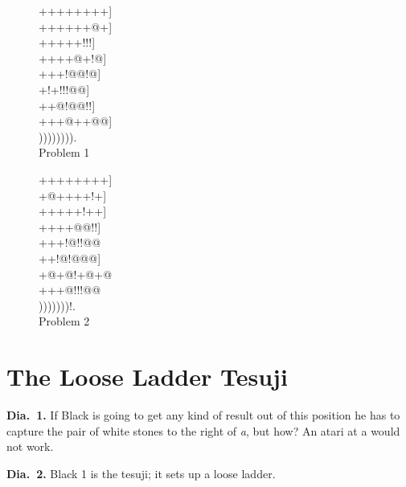 \documentclass[mcrownvopaper,10pt,oneside,onecolumn,draft,showtrims]{memoir}
\begin{document}
\begin{figure}[ht]
    \begin{minipage}[c]{0.5\linewidth}
        \centering    
        {\gnos%
        ++++++++]\\
        ++++++@+]\\
        +++++!!!]\\
        ++++@+!@]\\
        +++!@@!@]\\
        +!+!!!@@]\\
        ++@!@@!!]\\
        +++@++@@]\\
        )))))))).\\
        }
        Problem 1
    \end{minipage}%
    \begin{minipage}[c]{0.5\linewidth}
        \centering    
        {\gnos%
        ++++++++]\\
        +@++++!+]\\
        +++++!++]\\
        ++++@@!!]\\
        +++!@!!@@\\
        ++!@!@@@]\\
        +@+@!+@+@\\
        +++@!!!@@\\
        )))))))!.\\
        }
        Problem 2
    \end{minipage}
\end{figure}

\section{The Loose Ladder Tesuji}
\noindent
\textbf{Dia.\ 1.} If Black is going to get any kind of result out of this position he
has to capture the pair of white stones to the right of \textit{a}, but how? An
atari at a would not work.

\noindent
\textbf{Dia.\ 2.} Black 1 is the tesuji; it sets up a loose ladder.
\end{document}

